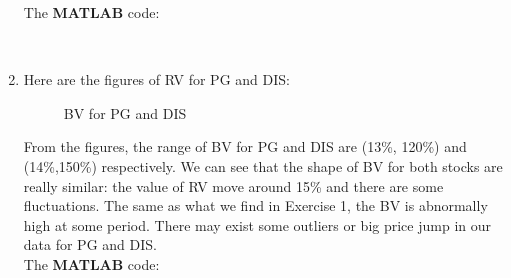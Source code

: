 \documentclass[12pt,letterpaper]{article}
\begin{document}
\begin{enumerate}[label=\textbf{(\Alph*)}]
The \textbf{MATLAB} code:
   
   ~~\\
\item
Here are the figures of RV for PG and DIS:
 \begin{figure}[H]
            \centering
            \caption{BV for PG and DIS}
\end{figure}

From the figures, the range of BV for PG and DIS are (13\%, 120\%) and (14\%,150\%) respectively. We can see that the shape of BV for both stocks are really similar: the value of RV move around 15\% and there are some fluctuations. The same as what we find in Exercise 1, the BV is abnormally high at some period. There may exist some outliers or big price jump in our data for PG and DIS.\\


The \textbf{MATLAB} code:
   
~~\\
   

\end{enumerate}
\end{document}
